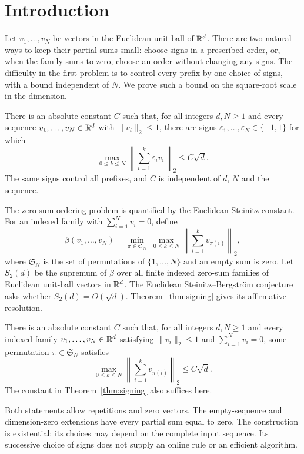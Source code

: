 \section{Introduction}

Let $v_1,\ldots,v_N$ be vectors in the Euclidean unit ball of $\mathbb R^d$.
There are two natural ways to keep their partial sums small: choose signs
in a prescribed order, or, when the family sums to zero, choose an order
without changing any signs. The difficulty in the first problem is to
control every prefix by one choice of signs, with a bound independent of
$N$. We prove such a bound on the square-root scale in the dimension.

\begin{theorem}\label{thm:signing}
There is an absolute constant $C$ such that, for all integers $d,N\ge1$ and
every sequence $v_1,\ldots,v_N\in\mathbb R^d$ with $\lVert v_i\rVert_2\le1$,
there are signs $\varepsilon_1,\ldots,\varepsilon_N\in\{-1,1\}$ for which
\[
 \max_{0\le k\le N}
 \left\lVert\sum_{i=1}^k\varepsilon_i v_i\right\rVert_2\le C\sqrt d.
\]
The same signs control all prefixes, and $C$ is independent of $d$, $N$
and the sequence.
\end{theorem}

The zero-sum ordering problem is quantified by the Euclidean Steinitz
constant. For an indexed family with $\sum_{i=1}^N v_i=0$, define
\[
 \beta(v_1,\ldots,v_N)
 =\min_{\pi\in\mathfrak S_N}\;
   \max_{0\le k\le N}\left\lVert\sum_{i=1}^k v_{\pi(i)}\right\rVert_2,
\]
where $\mathfrak S_N$ is the set of permutations of $\{1,\ldots,N\}$
and an empty sum is zero. Let $S_2(d)$ be the supremum of $\beta$ over
all finite indexed zero-sum families of Euclidean unit-ball vectors in
$\mathbb R^d$. The Euclidean Steinitz--Bergstr\"om conjecture asks whether
$S_2(d)=O(\sqrt d)$. Theorem~\ref{thm:signing} gives its affirmative resolution.

\begin{theorem}\label{thm:steinitz}
There is an absolute constant $C$ such that, for all integers $d,N\ge1$ and
every indexed family $v_1,\ldots,v_N\in\mathbb R^d$ satisfying
$\lVert v_i\rVert_2\le1$ and $\sum_{i=1}^N v_i=0$, some permutation
$\pi\in\mathfrak S_N$ satisfies
\[
 \max_{0\le k\le N}\left\lVert\sum_{i=1}^k v_{\pi(i)}\right\rVert_2
 \le C\sqrt d.
\]
The constant in Theorem~\ref{thm:signing} also suffices here.
\end{theorem}

Both statements allow repetitions and zero vectors. The empty-sequence
and dimension-zero extensions have every partial sum equal to zero. The construction is
existential: its choices may depend on the complete input sequence. Its
successive choice of signs does not supply an online rule or an efficient
algorithm.


